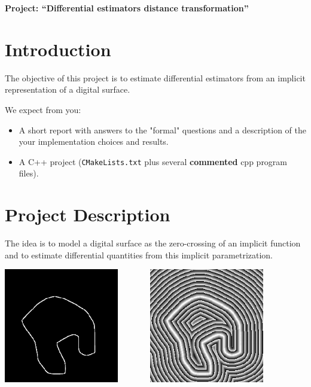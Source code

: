 \documentclass[a4paper, 11pt]{article}
\title{}
\author{}
\date{}
\begin{document}
\begin{center}
	\LARGE \textbf{Project: ``Differential estimators distance transformation''}
\end{center}

\section*{Introduction} 

The objective of this project is to estimate differential estimators
from an implicit representation of a digital surface.

We expect from you:
\begin{itemize}
\item A short report with answers to the "formal" questions and a
  description of the your implementation choices and results.
\item A C++ project (\texttt{CMakeLists.txt} plus several
  \textbf{commented} cpp program files).
\end{itemize}


\section{Project Description}


The idea is to model  a digital surface as the zero-crossing of an
implicit function and to estimate differential quantities from this
implicit parametrization.

\begin{center}
  \includegraphics[width=5cm]{images/contour.png}~~~~~~~
  \includegraphics[width=5cm]{images/contour_circ.png} 
\end{center}
\end{document}
